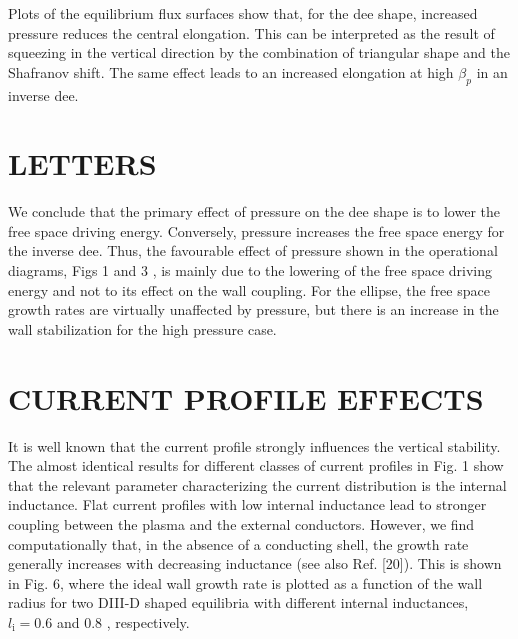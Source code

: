 \documentclass[10pt]{article}
\begin{document}
Plots of the equilibrium flux surfaces show that, for the dee shape, increased pressure reduces the central elongation. This can be interpreted as the result of squeezing in the vertical direction by the combination of triangular shape and the Shafranov shift. The same effect leads to an increased elongation at high $\beta_{p}$ in an inverse dee.

\section{LETTERS}
We conclude that the primary effect of pressure on the dee shape is to lower the free space driving energy. Conversely, pressure increases the free space energy for the inverse dee. Thus, the favourable effect of pressure shown in the operational diagrams, Figs 1 and 3 , is mainly due to the lowering of the free space driving energy and not to its effect on the wall coupling. For the ellipse, the free space growth rates are virtually unaffected by pressure, but there is an increase in the wall stabilization for the high pressure case.

\section{CURRENT PROFILE EFFECTS}
It is well known that the current profile strongly influences the vertical stability. The almost identical results for different classes of current profiles in Fig. 1 show that the relevant parameter characterizing the current distribution is the internal inductance. Flat current profiles with low internal inductance lead to stronger coupling between the plasma and the external conductors. However, we find computationally that, in the absence of a conducting shell, the growth rate generally increases with decreasing inductance (see also Ref. [20]). This is shown in Fig. 6, where the ideal wall growth rate is plotted as a function of the wall radius for two DIII-D shaped equilibria with different internal inductances, $l_{\mathrm{i}}=0.6$ and 0.8 , respectively.
\end{document}
